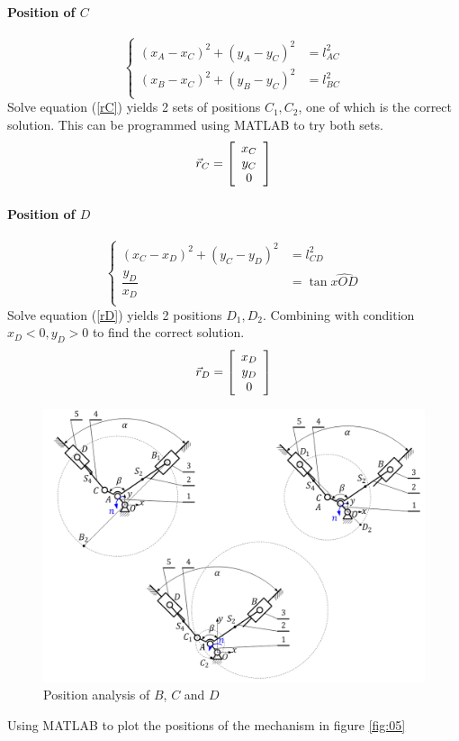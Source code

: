 \paragraph{Position of $ C $}
\begin{equation}\label{rC}
\left\{
\begin{array}{cl}
(x_A-x_C)^2+(y_A-y_C)^2&=l_{AC}^2\\
(x_B-x_C)^2+(y_B-y_C)^2&=l_{BC}^2\\
\end{array}
\right.
\end{equation}
Solve equation (\ref{rC}) yields 2 sets of positions $ C_1, C_2 $, one of which is the correct solution. This can be programmed using MATLAB\textup{\textregistered} to try both sets.
\[\vec{r}_C=
\left[ \begin{array}{c} x_C\\ y_C\\ 0 \end{array}\right]\]
\paragraph{Position of $ D $}
\begin{equation}\label{rD}
\left\{
\begin{array}{cl}
(x_C-x_D)^2+(y_C-y_D)^2&=l_{CD}^2\\
\dfrac{y_D}{x_D}&=\tan \widehat{xOD}\\
\end{array}
\right.
\end{equation}
Solve equation (\ref{rD}) yields 2 positions $ D_1, D_2 $. Combining with condition $ x_D<0,y_D>0 $ to find the correct solution.
\[\vec{r}_D=
\left[ \begin{array}{c} x_D\\ y_D\\ 0 \end{array}\right]\]
\begin{figure}
	\centering
	\includegraphics[width=0.8\linewidth]{04}
	\caption{Position analysis of $B$, $C$ and $D$}
	\label{fig:04}
\end{figure}
Using MATLAB\textup{\textregistered} to plot the positions of the mechanism in figure \ref{fig:05}
